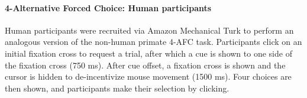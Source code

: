 \paragraph{4-Alternative Forced Choice: Human participants} 
Human participants were recruited via Amazon Mechanical Turk to perform an analogous version of the non-human primate 4-AFC task. 
Participants click on an initial fixation cross to request a trial, after which a cue is shown to one side of the fixation cross (750 ms). 
After cue offset, a fixation cross is shown and the cursor is hidden to de-incentivize mouse movement (1500 ms). 
Four choices are then shown, and participants make their selection by clicking. 








